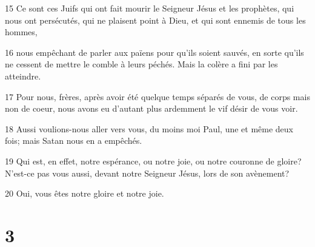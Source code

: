 \par 15 Ce sont ces Juifs qui ont fait mourir le Seigneur Jésus et les prophètes, qui nous ont persécutés, qui ne plaisent point à Dieu, et qui sont ennemis de tous les hommes,
\par 16 nous empêchant de parler aux païens pour qu'ils soient sauvés, en sorte qu'ils ne cessent de mettre le comble à leurs péchés. Mais la colère a fini par les atteindre.
\par 17 Pour nous, frères, après avoir été quelque temps séparés de vous, de corps mais non de coeur, nous avons eu d'autant plus ardemment le vif désir de vous voir.
\par 18 Aussi voulions-nous aller vers vous, du moins moi Paul, une et même deux fois; mais Satan nous en a empêchés.
\par 19 Qui est, en effet, notre espérance, ou notre joie, ou notre couronne de gloire? N'est-ce pas vous aussi, devant notre Seigneur Jésus, lors de son avènement?
\par 20 Oui, vous êtes notre gloire et notre joie.

\chapter{3}

